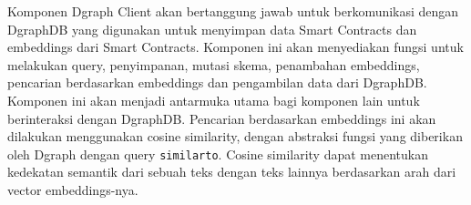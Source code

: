 Komponen Dgraph Client akan bertanggung jawab untuk berkomunikasi dengan DgraphDB yang digunakan untuk menyimpan data Smart Contracts dan embeddings dari Smart Contracts. Komponen ini akan menyediakan fungsi untuk melakukan query, penyimpanan, mutasi skema, penambahan embeddings, pencarian berdasarkan embeddings dan pengambilan data dari DgraphDB. Komponen ini akan menjadi antarmuka utama bagi komponen lain untuk berinteraksi dengan DgraphDB. Pencarian berdasarkan embeddings ini akan dilakukan menggunakan cosine similarity, dengan abstraksi fungsi yang diberikan oleh Dgraph dengan query \texttt{similar\textunderscore to}. Cosine similarity dapat menentukan kedekatan semantik dari sebuah teks dengan teks lainnya berdasarkan arah dari vector embeddings-nya.

